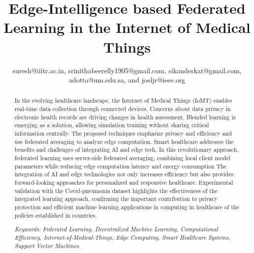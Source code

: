 \documentclass[conference]{IEEEtran}
\begin{document}
\title{Edge-Intelligence based Federated Learning in the Internet of Medical Things}
\author{	
\vspace{0.1in}
suresh@iiitr.ac.in, srinithabeerelly1905@gmail.com,  sikanderkat@gmail.com, adotta@um.edu.sa, and joeljr@ieee.org }

\maketitle

\begin{abstract}
In the evolving healthcare landscape, the Internet of Medical Things (IoMT) enables real-time data collection through connected devices. Concerns about data privacy in electronic health records are driving changes in health assessment. Blended learning is emerging as a solution, allowing simulation training without sharing critical information centrally. The proposed techniques emphasize privacy and efficiency and use federated averaging to analyze edge computation. Smart healthcare addresses the benefits and challenges of integrating AI and edge tech. In this revolutionary approach, federated learning uses server-side federated averaging, combining local client model parameters while reducing edge computation latency and energy consumption The integration of AI and edge technologies not only increases efficiency but also provides forward-looking approaches for personalized and responsive healthcare. Experimental validation with the Covid-pneumonia dataset highlights the effectiveness of the integrated learning approach, confirming the important contribution to privacy protection and efficient machine learning applications in computing in healthcare of the policies established in countries.

\textit{Keywords: Federated Learning, Decentralized Machine Learning, Computational Efficiency, Internet-of-Medical-Things, Edge Computing, Smart Healthcare Systems, Support Vector Machines.}


\end{abstract}
\end{document}
